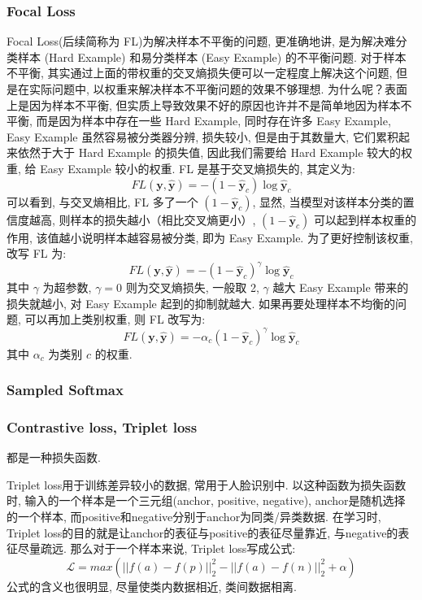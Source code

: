 \subsubsection{Focal Loss}
Focal Loss(后续简称为 FL)为解决样本不平衡的问题, 更准确地讲, 是为解决难分类样本 (Hard Example) 和易分类样本 (Easy Example) 的不平衡问题. 对于样本不平衡, 其实通过上面的带权重的交叉熵损失便可以一定程度上解决这个问题, 但是在实际问题中, 以权重来解决样本不平衡问题的效果不够理想. 为什么呢？表面上是因为样本不平衡, 但实质上导致效果不好的原因也许并不是简单地因为样本不平衡, 而是因为样本中存在一些 Hard Example, 同时存在许多 Easy Example, Easy Example 虽然容易被分类器分辨, 损失较小, 但是由于其数量大, 它们累积起来依然于大于 Hard Example 的损失值, 因此我们需要给 Hard Example 较大的权重, 给 Easy Example 较小的权重. FL 是基于交叉熵损失的, 其定义为: 
$$
FL(\boldsymbol{y}, \hat{\boldsymbol{y}}) = -(1-\hat{\boldsymbol{y}}_c) \log \hat{\boldsymbol{y}}_c
$$
可以看到, 与交叉熵相比, FL 多了一个 $(1-\hat{\boldsymbol{y}}_c)$, 显然, 当模型对该样本分类的置信度越高, 则样本的损失越小（相比交叉熵更小）, $(1-\hat{\boldsymbol{y}}_c)$ 可以起到样本权重的作用, 该值越小说明样本越容易被分类, 即为 Easy Example. 为了更好控制该权重, 改写 FL 为: 
$$
FL(\boldsymbol{y}, \hat{\boldsymbol{y}}) = -(1-\hat{\boldsymbol{y}}_c)^\gamma \log \hat{\boldsymbol{y}}_c
$$
其中 $\gamma$ 为超参数, $\gamma=0$ 则为交叉熵损失, 一般取 2, $\gamma$ 越大 Easy Example 带来的损失就越小, 对 Easy Example 起到的抑制就越大. 如果再要处理样本不均衡的问题, 可以再加上类别权重, 则 FL 改写为: 
$$
FL(\boldsymbol{y}, \hat{\boldsymbol{y}}) = - \alpha_c (1-\hat{\boldsymbol{y}}_c)^\gamma \log \hat{\boldsymbol{y}}_c
$$
其中 $\alpha_c$ 为类别 $c$ 的权重. 

\subsubsection{Sampled Softmax}

\subsubsection{Contrastive loss, Triplet loss} 
都是一种损失函数. 

Triplet loss用于训练差异较小的数据, 常用于人脸识别中. 以这种函数为损失函数时, 输入的一个样本是一个三元组(anchor, positive, negative), anchor是随机选择的一个样本, 而positive和negative分别于anchor为同类/异类数据. 在学习时, Triplet loss的目的就是让anchor的表征与positive的表征尽量靠近, 与negative的表征尽量疏远. 那么对于一个样本来说, Triplet loss写成公式:  
$$
\mathcal{L} = max( ||f(a)-f(p)||_2^2 - ||f(a) - f(n)||_2^2 + \alpha )
$$
公式的含义也很明显, 尽量使类内数据相近, 类间数据相离. 

